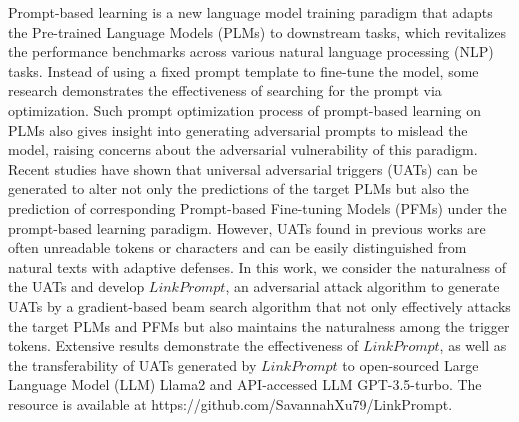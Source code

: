 Prompt-based learning is a new language model training paradigm that adapts the Pre-trained Language Models (PLMs) to downstream tasks, which revitalizes the performance benchmarks across various natural language processing (NLP) tasks. Instead of using a fixed prompt template to fine-tune the model, some research demonstrates the effectiveness of searching for the prompt via optimization. Such prompt optimization process of prompt-based learning on PLMs also gives insight into generating adversarial prompts to mislead the model, raising concerns about the adversarial vulnerability of this paradigm. Recent studies have shown that universal adversarial triggers (UATs) can be generated to alter not only the predictions of the target PLMs but also the prediction of corresponding Prompt-based Fine-tuning Models (PFMs) under the prompt-based learning paradigm. However, UATs found in previous works are often unreadable tokens or characters and can be easily distinguished from natural texts with adaptive defenses. In this work, we consider the naturalness of the UATs and develop $\textit{LinkPrompt}$, an adversarial attack algorithm to generate UATs by a gradient-based beam search algorithm that not only effectively attacks the target PLMs and PFMs but also maintains the naturalness among the trigger tokens. Extensive results demonstrate the effectiveness of $\textit{LinkPrompt}$, as well as the transferability of UATs generated by $\textit{LinkPrompt}$ to open-sourced Large Language Model (LLM) Llama2 and API-accessed LLM GPT-3.5-turbo. The resource is available at https://github.com/SavannahXu79/LinkPrompt.